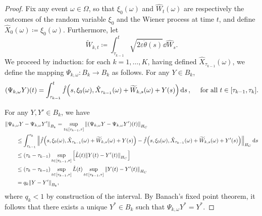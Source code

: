\begin{proof}
  Fix any event \(\omega \in \Omega\), so that \(\xi_{0}(\omega)\) and \(\hat{W}_{t}(\omega)\) are respectively the outcomes of the random variable \(\xi_{0}\) and the Wiener process at time \(t\), and define \(\hat{X}_{0}(\omega) \coloneqq \xi_{0}(\omega)\). Furthermore, let
  \[
    \widetilde{W}_{k, t} \coloneqq \int_{\tau_{k-1}}^{t} \sqrt{2\varepsilon \dot{\theta}(s)}\dd{ \hat{W}_{s}}.
  \] We proceed by induction: for each \(k = 1, \ldots, K\), having defined \(\hat{X}_{\tau_{k-1}}(\omega)\), we define the mapping \(\Psi_{k, \omega} : B_{k} \to B_{k}\) as follows. For any \(Y \in B_{k}\),
  \begin{equation}
    (\Psi_{k, \omega} Y)(t) = \int_{\tau_{k-1}}^{t} \hat{f}\qty(s, \xi_{0}(\omega), \hat{X}_{\tau_{k-1}}(\omega) + \widetilde{W}_{k, s}(\omega) + Y(s)) \dd{s}, \quad \text{ for all } t \in [\tau_{k-1}, \tau_{k}]. \label{eqn:banach-iteration}
  \end{equation}

  For any \(Y, Y' \in B_{k}\), we have
  \begin{align*}
    &\norm{\Psi_{k, \omega} Y - \Psi_{k, \omega} Y'}_{B_{k}} = \sup_{t \in [\tau_{k-1}, \tau]} \norm{ (\Psi_{k, \omega} Y - \Psi_{k, \omega} Y')(t) }_{H_{C}} \\
    &\qquad\leq \int_{\tau_{k-1}}^{\tau_{k}} \norm{ \hat{f}\qty(s, \xi_{0}(\omega), \hat{X}_{\tau_{k-1}}(\omega) + \widetilde{W}_{k, s}(\omega) + Y(s)) - \hat{f}\qty(s, \xi_{0}(\omega), \hat{X}_{\tau_{k-1}}(\omega) + \widetilde{W}_{k, s}(\omega) + Y'(s))}_{H_{C}} \dd{s}\\
    &\qquad\leq (\tau_{k} - \tau_{k-1})\sup_{t \in [\tau_{k-1}, \tau]} \qty[\hat{L}(t) \norm{Y(t) - Y'(t)}_{H_{C}}] \\
    &\qquad\leq (\tau_{k} - \tau_{k-1})\sup_{t \in [\tau_{k-1}, \tau]} \hat{L}(t) \sup_{t \in [\tau_{k-1}, \tau]} \norm{Y(t) - Y'(t)}_{H_{C}} \\
    &\qquad= q_{k} \norm{Y - Y'}_{B_{k}},
  \end{align*}
  where \(q_{k} < 1\) by construction of the interval. By Banach's fixed point theorem, it follows that there exists a unique \(Y^{*} \in B_{k}\) such that \(\Psi_{k, \omega} Y^{*} = Y^{*}\).


\end{proof}
